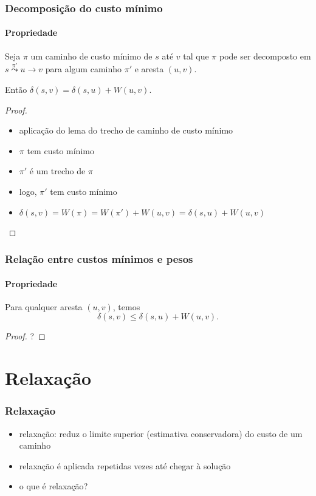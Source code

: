 \documentclass{beamer}
\begin{document}
\begin{frame}
\frametitle{Decomposição do custo mínimo}
\framesubtitle{Propriedade}

\begin{corollary}
Seja $\pi$ um caminho de custo mínimo de $s$ até $v$ tal que 
$\pi$ pode ser decomposto em $s \overset{\pi'}{\leadsto} u \rightarrow v$
para algum caminho $\pi'$ e aresta $(u, v)$.

Então $\delta(s, v) = \delta(s, u) + W(u, v)$.
\end{corollary}
\pause
\begin{proof}
\begin{itemize}
\item aplicação do lema do trecho de caminho de custo mínimo
\item $\pi$ tem custo mínimo
\item $\pi'$ é um trecho de $\pi$
\item logo, $\pi'$ tem custo mínimo
\item $\delta(s, v) = W(\pi) = W(\pi')+W(u,v) = \delta(s, u) + W(u, v)$
\end{itemize}
\end{proof}
\end{frame}

\begin{frame}
\frametitle{Relação entre custos mínimos e pesos}
\framesubtitle{Propriedade}

\begin{lemma}
Para qualquer aresta $(u, v)$, temos
$$\delta(s, v) \le \delta(s, u) + W(u, v).$$
\end{lemma}
\pause
\begin{proof}
?
\end{proof}
\end{frame}

\section{Relaxação}

\begin{frame}
\frametitle{Relaxação}

\begin{itemize}
\item relaxação: reduz o limite superior (\alert{estimativa conservadora})
  do custo de um caminho
\item relaxação é aplicada repetidas vezes até chegar à solução
\item o que é \alert{relaxação}?
\end{itemize}
\end{frame}
\end{document}
